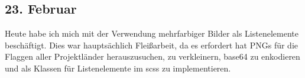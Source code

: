 \subsection{23. Februar}
Heute habe ich mich mit der Verwendung mehrfarbiger Bilder als Listenelemente beschäftigt. Dies war hauptsächlich Fleißarbeit, da es erfordert hat PNGs für die Flaggen aller Projektländer herauszusuchen, zu verkleinern, base64 zu enkodieren und als Klassen für Listenelemente im scss zu implementieren.